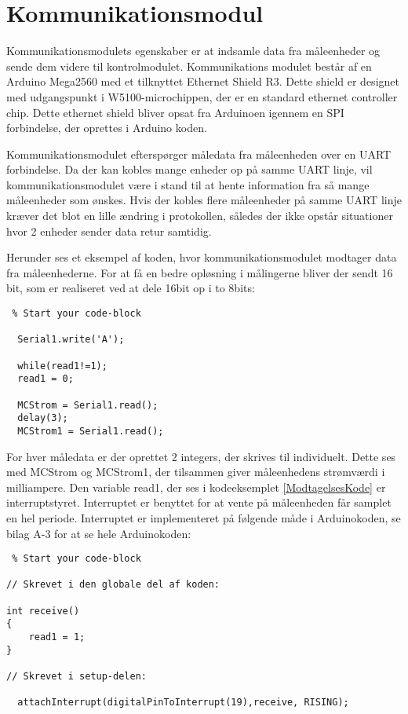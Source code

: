 
\section{Kommunikationsmodul}
\label{sec:Kommunikationsmodul}
Kommunikationsmodulets egenskaber er at indsamle data fra måleenheder og sende dem videre til kontrolmodulet. Kommunikations modulet består af en Arduino Mega2560 med et tilknyttet Ethernet Shield R3. Dette shield er designet med udgangspunkt i W5100-microchippen, der er en standard ethernet controller chip. Dette ethernet shield bliver opsat fra Arduinoen igennem en SPI forbindelse, der oprettes i Arduino koden. 

Kommunikationsmodulet efterspørger måledata fra måleenheden over en UART forbindelse. Da der kan kobles mange enheder op på samme UART linje, vil kommunikationsmodulet være i stand til at hente information fra så mange måleenheder som ønskes. Hvis der kobles flere måleenheder på samme UART linje kræver det blot en lille ændring i protokollen, således der ikke opstår situationer hvor 2 enheder sender data retur samtidig. 


Herunder ses et eksempel af koden, hvor kommunikationsmodulet modtager data fra måleenhederne. For at få en bedre opløsning i målingerne bliver der sendt 16 bit, som er realiseret ved at dele 16bit op i to 8bits: 

\begin{lstlisting} % Start your code-block
  
  Serial1.write('A');
  
  while(read1!=1);
  read1 = 0;
  
  MCStrom = Serial1.read();
  delay(3);
  MCStrom1 = Serial1.read();
\end{lstlisting}


For hver måledata er der oprettet 2 integers, der skrives til individuelt. Dette ses med MCStrom og MCStrom1, der tilsammen giver måleenhedens strømværdi i milliampere. 
Den variable read1, der ses i kodeeksemplet \ref{ModtagelsesKode} er interruptstyret. Interruptet er benyttet for at vente på måleenheden får samplet en hel periode. Interruptet er implementeret på følgende måde i Arduinokoden, se bilag A-3 for at se hele Arduinokoden: 

\begin{lstlisting} % Start your code-block

// Skrevet i den globale del af koden:

int receive()
{
	read1 = 1;
}

// Skrevet i setup-delen:

  attachInterrupt(digitalPinToInterrupt(19),receive, RISING);

\end{lstlisting}


